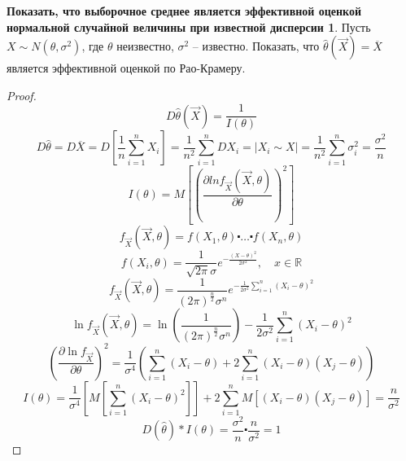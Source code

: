 \documentclass[a4paper, 12pt]{article}
\theoremstyle{definition}
\theoremstyle{leads}
\theoremstyle{example}
\begin{document}
\newtheorem*{Rao2}{Показать, что выборочное среднее является эффективной оценкой нормальной случайной величины при известной дисперсии}
\begin{Rao2}
	Пусть $X \sim N(\theta, \sigma^2)$, где $\theta$ неизвестно, $\sigma^2$ -- известно.
Показать, что $\hat{\theta}(\vec{X}) = \overline{X}$  является эффективной оценкой по Рао-Крамеру.
\end{Rao2}
\begin{proof}
	\begin{displaymath}
		D\hat{\theta}(\vec{X}) = \frac{1}{I(\theta)}
	\end{displaymath}
	\begin{displaymath}
	D\hat{\theta} = D\overline{X} = D[\frac{1}{n} \sum_{i=1}^{n} X_i] = \frac{1}{n^2} \sum_{i=1}^{n}DX_i =  |X_i \sim X| = \frac{1}{n^2}\sum_{i=1}^{n} \sigma_i^2 = \frac{\sigma^2}{n}
	\end{displaymath}
	\begin{displaymath}
		I(\theta) = M [(\frac{\partial ln f_{\vec{X}}(\vec{X}, \theta)}{\partial \theta})^2]
	\end{displaymath}
	\begin{displaymath}
		f_{\vec{X}}(\vec{X}, \theta) = f(X_1, \theta) \centerdot\dots \centerdot f(X_n, \theta)
	\end{displaymath}
	\begin{displaymath}
		f(X_i, \theta) = \frac{1}{\sqrt{2\pi} \sigma} e^{-\frac{(X - \theta)^2}{2\sigma^2}}, \quad x \in \mathbb{R}
	\end{displaymath}
	\begin{displaymath}
		f_{\vec{X}}(\vec{X}, \theta) = \frac{1}{(2\pi)^{\frac{n}{2}}\sigma^n} e^{-\frac{1}{2\sigma^2}\sum_{i=1}^{n}(X_i - \theta)^2}
	\end{displaymath}
	\begin{displaymath}
		\ln f_{\vec{X}}(\vec{X}, \theta) = \ln (\frac{1}{(2\pi)^{\frac{n}{2}}\sigma^n}) - \frac{1}{2\sigma^2} \sum_{i=1}^{n}(X_i - \theta)^2
	\end{displaymath}
	\begin{displaymath}
		(\frac{\partial \ln f_{\vec{X}}}{\partial \theta})^2 = \frac{1}{\sigma^4}(\sum_{i=1}^{n}(X_i - \theta) + 2\sum_{i=1}^{n}(X_i - \theta)(X_j - \theta))
	\end{displaymath}
	\begin{displaymath}
		I(\theta) = \frac{1}{\sigma^4}[M[\sum_{i=1}^{n}(X_i - \theta)^2]] + 2 \sum_{i=1}^{n} M[(X_i - \theta)(X_j - \theta)] = \frac{n}{\sigma^2}
	\end{displaymath}
	\begin{displaymath}
		D(\hat{\theta}) * I(\theta) = \frac{\sigma^2}{n} \centerdot\frac{n}{\sigma^2} = 1
	\end{displaymath}
\end{proof}
\end{document}
